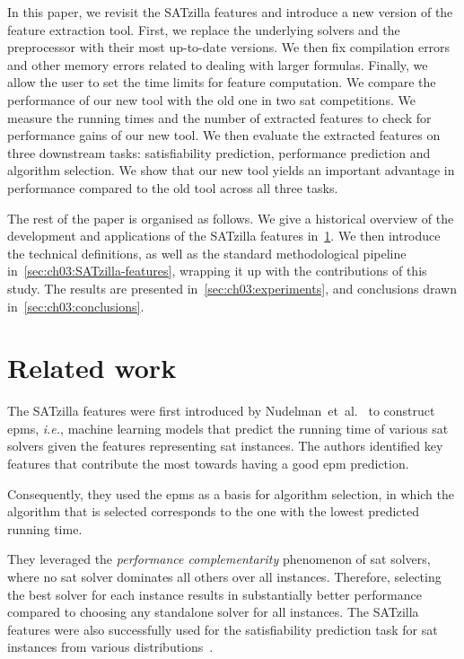 In this paper, we revisit the SATzilla features and introduce a new version of the feature extraction tool. First, we replace the underlying solvers and the preprocessor with their most up-to-date versions. We then fix compilation errors and other memory errors related to dealing with larger formulas. Finally, we allow the user to set the time limits for feature computation. 
We compare the performance of our new tool with the old one in two \gls{sat} competitions. We measure the running times and the number of extracted features to check for performance gains of our new tool. We then evaluate the extracted features on three downstream tasks: satisfiability prediction, performance prediction and algorithm selection. We show that our new tool yields an important advantage in performance compared to the old tool across all three tasks.

The rest of the paper is organised as follows. We give a historical overview of the development and applications of the SATzilla features in~\cref{sec:ch03:related-work}. We then introduce the technical definitions, as well as the standard methodological pipeline in~\cref{sec:ch03:SATzilla-features}, wrapping it up with the contributions of this study. The results are presented in~\cref{sec:ch03:experiments}, and conclusions drawn in~\cref{sec:ch03:conclusions}.

\section{Related work}
\label{sec:ch03:related-work}


The SATzilla features were first introduced by Nudelman~et~al.~\cite{NudEtAl04} to construct \glspl{epm}, \emph{i.e.}, machine learning models that predict the running time of various \gls{sat} solvers given the features representing \gls{sat} instances. The authors identified key features that contribute the most towards having a good \gls{epm} prediction.

Consequently, they used the \glspl{epm} as a basis for algorithm selection, in which the algorithm that is selected corresponds to the one with the lowest predicted running time. 

They leveraged the \textit{performance complementarity} phenomenon of \gls{sat} solvers, where no \gls{sat} solver dominates all others over all instances. 
Therefore, selecting the best solver for each instance results in substantially better performance compared to choosing any standalone solver for all instances.
The SATzilla features were also successfully used for the satisfiability prediction task for \gls{sat} instances from various distributions~\cite{DevOSu08}. 


